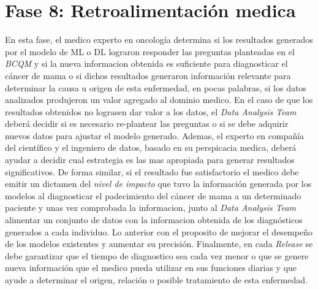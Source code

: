 \section{Fase 8: Retroalimentación medica }
En esta fase, el medico experto en oncología determina si los resultados generados por el modelo de ML o DL lograron responder las preguntas planteadas en el \textit{BCQM} y si la nueva informacion obtenida es suficiente para diagnosticar el cáncer de mama o si dichos resultados generaron información relevante para determinar la causa u origen de esta enfermedad, en pocas palabras, si los datos analizados produjeron un valor agregado al dominio medico. En el caso de que los resultados obtenidos no lograsen dar valor a los datos, el \textit{Data Analysis Team} deberá decidir si es necesario re-plantear las preguntas o si se debe adquirir nuevos datos para ajustar el modelo generado. Ademas, el experto en compañía del científico y el ingeniero de datos, basado en su perspicacia medica, deberá ayudar a decidir cual estrategia es las mas apropiada para generar resultados significativos. De forma similar, si el resultado fue satisfactorio el medico debe emitir un dictamen del \textit{nivel de impacto} que tuvo la información generada por los modelos al diagnosticar el padecimiento del cáncer de mama a un determinado paciente y unas vez comprobada la informacion, junto al \textit{Data Analysis Team} alimentar un conjunto de datos con la informacion obtenida de los diagnósticos generados a cada individuo. Lo anterior con el proposito de mejorar el desempeño de los modelos existentes y aumentar su precisión. Finalmente, en cada \textit{Release} se debe garantizar que el tiempo de diagnostico sea cada vez menor o que se genere nueva información que el medico pueda utilizar en sus funciones diarias y que ayude a determinar el origen, relación o posible tratamiento de esta enfermedad.